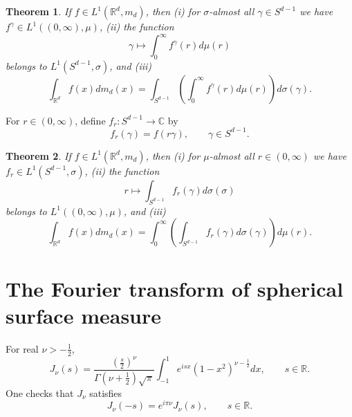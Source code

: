 \documentclass{article}
\newtheorem{theorem}{Theorem}
\begin{document}
\begin{theorem}
If $f \in L^1(\mathbb{R}^d,m_d)$, then (i) for $\sigma$-almost all $\gamma \in S^{d-1}$ we have $f^\gamma \in L^1((0,\infty),\mu)$, 
(ii) the function
\[
\gamma \mapsto \int_0^\infty f^\gamma(r) d\mu(r)
\]
belongs to $L^1(S^{d-1},\sigma)$, and (iii)
\[
\int_{\mathbb{R}^d} f(x) dm_d(x) = \int_{S^{d-1}} \left( \int_0^\infty f^\gamma(r) d\mu(r) \right) d\sigma(\gamma).
\]
\end{theorem}

For $r \in (0,\infty)$, define $f_r:S^{d-1} \to \mathbb{C}$ by
\[
f_r(\gamma) = f(r\gamma), \qquad \gamma \in S^{d-1}.
\]

\begin{theorem}
If $f \in L^1(\mathbb{R}^d,m_d)$, then (i) for $\mu$-almost all $r \in (0,\infty)$ we have $f_r \in L^1(S^{d-1},\sigma)$, 
(ii) the function
\[
r \mapsto \int_{S^{d-1}} f_r(\gamma) d\sigma(\sigma)
\]
belongs to $L^1((0,\infty),\mu)$, and (iii)
\[
\int_{\mathbb{R}^d} f(x) dm_d(x) = \int_0^\infty \left( \int_{S^{d-1}}  f_r(\gamma) d\sigma(\gamma) \right) d\mu(r).
\]
\end{theorem}



\section{The Fourier transform of spherical surface measure}
For real $\nu>-\frac{1}{2}$,
\[
J_\nu(s) = \frac{\left(\frac{s}{2}\right)^\nu}{\Gamma\left(\nu+\frac{1}{2}\right)\sqrt{\pi}} \int_{-1}^1
e^{isx} (1-x^2)^{\nu-\frac{1}{2}} dx, \qquad s \in \mathbb{R}.
\]
One checks that $J_\nu$ satisfies
\[
J_\nu(-s)=e^{i\pi \nu} J_\nu(s), \qquad s \in \mathbb{R}.
\]
\end{document}
